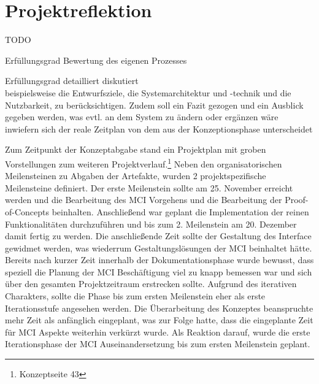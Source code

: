 
\chapter{Projektreflektion}
TODO

Erfüllungsgrad
Bewertung des eigenen Prozesses


Erfüllungsgrad detailliert diskutiert\\ 
beispielsweise die Entwurfsziele, die Systemarchitektur und -technik und die Nutzbarkeit, zu berücksichtigen. Zudem soll ein Fazit gezogen und ein Ausblick gegeben werden, was evtl. an dem System zu ändern oder ergänzen wäre\\
inwiefern sich der reale Zeitplan von dem aus der Konzeptionsphase unterscheidet

Zum Zeitpunkt der Konzeptabgabe stand ein Projektplan mit groben Vorstellungen zum weiteren Projektverlauf.\footnote{Konzeptseite 43} Neben den organisatorischen Meilensteinen zu Abgaben der Artefakte, wurden 2 projektspezifische Meilensteine definiert. Der erste Meilenstein sollte am 25. November erreicht werden und die Bearbeitung des MCI Vorgehens und die Bearbeitung der Proof-of-Concepts beinhalten. 
Anschließend war geplant die Implementation der reinen Funktionalitäten durchzuführen und bis zum 2. Meilenstein am 20. Dezember damit fertig zu werden. Die anschließende Zeit sollte der Gestaltung des Interface gewidmet werden, was wiederrum Gestaltungslösungen der MCI beinhaltet hätte. \\
Bereits nach kurzer Zeit innerhalb der Dokumentationsphase wurde bewusst, dass speziell die Planung der MCI Beschäftigung viel zu knapp bemessen war und sich über den gesamten Projektzeitraum erstrecken sollte. Aufgrund des iterativen Charakters, sollte die Phase bis zum ersten Meilenstein eher als erste Iterationsstufe angesehen werden. Die Überarbeitung des Konzeptes beanspruchte mehr Zeit als anfänglich eingeplant, was zur Folge hatte, dass die eingeplante Zeit für MCI Aspekte weiterhin verkürzt wurde. Als Reaktion darauf, wurde die erste Iterationsphase der MCI Auseinandersetzung bis zum ersten Meilenstein geplant. 

